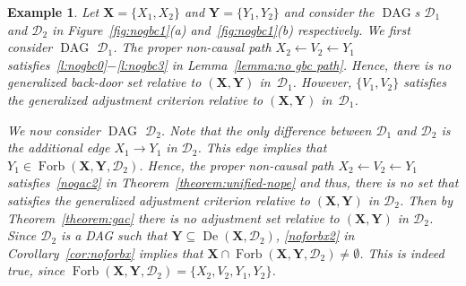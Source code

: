 \documentclass[11pt,a4paper]{article}
\newtheorem{example}{Example}
\DeclareMathOperator{\DAG}{DAG}
\DeclareMathOperator{\De}{De}
\DeclareMathOperator{\Forbi}{Forb}
\newcommand{\g}[1][G]{\mathcal{#1}}
\newcommand{\fb}[2][X,Y]{\Forbi(\mathbf{#1},#2)}%
\begin{document}
\begin{example} 
 Let $\mathbf{X} = \{X_1,X_2\}$ and $\mathbf{Y} = \{Y_1,Y_2\}$ and consider the $\DAG$s $\g[D]_1$ and $\g[D]_2$ in Figure~\ref{fig:nogbc1}(a) and~\ref{fig:nogbc1}(b) respectively.
   We first consider $\DAG$ $\g[D]_1$.
   The proper non-causal path $X_2 \leftarrow V_2 \leftarrow Y_1$ satisfies~\ref{l:nogbc0}$-$\ref{l:nogbc3} in Lemma~\ref{lemma:no gbc path}. Hence, there is no generalized back-door set relative to $(\mathbf{X},\mathbf{Y})$ in~$\g[D]_1$. However, $\{ V_1,V_2\}$ satisfies the generalized adjustment criterion relative to $(\mathbf{X},\mathbf{Y})$ in~$\g[D]_1$.

We now consider $\DAG$ $\g[D]_2$. Note that the only difference between $\g[D]_1$ and $\g[D]_2$ is the additional edge $X_1 \rightarrow Y_1$ in $\g[D]_2$. This edge implies that $Y_1 \in \fb{\g[D]_2}$. Hence, the proper non-causal path $X_2 \leftarrow V_2 \leftarrow Y_1$ satisfies~\ref{nogac2} in Theorem~\ref{theorem:unified-nope} and thus, there is no set that satisfies the generalized adjustment criterion relative to $(\mathbf{X,Y})$ in $\g[D]_2$. Then by Theorem~\ref{theorem:gac} there is no adjustment set relative to $(\mathbf{X,Y})$ in $\g[D]_2$. Since $\g[D]_2$ is a DAG such that $\mathbf{Y} \subseteq \De(\mathbf{X},\g[D]_2)$, \ref{noforbx2} in Corollary~\ref{cor:noforbx} implies that $\mathbf{X} \cap \fb{\g[D]_2} \neq \emptyset$. This is indeed true, since  $\fb{\g[D]_2} = \{ X_2,V_2,Y_1,Y_2\}$. 
   \label{ex:nogbc1}
\end{example}
\end{document}
